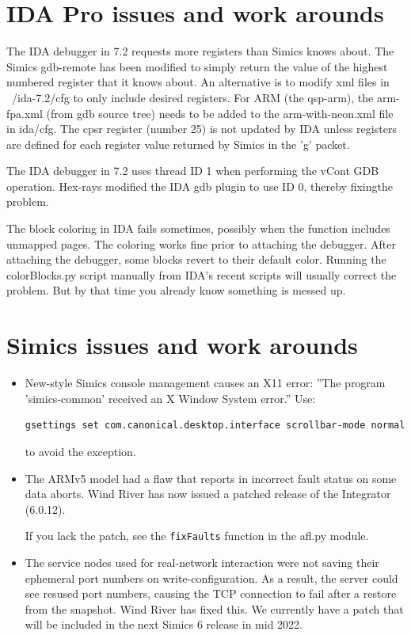 \documentclass[titlepage]{article}
\begin{document}
\begin{appendices}
\section{IDA Pro issues and work arounds}
The IDA debugger in 7.2 requests more registers than Simics knows about.  The Simics gdb-remote has been modified
to simply return the value of the highest numbered register that it knows about.  An alternative is to modify
xml files in ~/ida-7.2/cfg to only include desired registers.   For ARM (the qsp-arm), the arm-fpa.xml (from gdb source
tree) needs to be added to the arm-with-neon.xml file in ida/cfg.  The cpsr register (number 25) is not updated by IDA
unless registers are defined for each register value returned by Simics in the 'g' packet.

The IDA debugger in 7.2 uses thread ID 1 when performing the vCont GDB operation.  Hex-rays modified the IDA gdb plugin to
use ID 0, thereby fixingthe problem.

The block coloring in IDA fails sometimes, possibly when the function includes unmapped pages.  The coloring works fine prior
to attaching the debugger.  After attaching the debugger, some blocks revert to their default color.  Running the colorBlocks.py script
manually from IDA's recent scripts will usually correct the problem.  But by that time you already know something is messed up.

\section{Simics issues and work arounds}
\begin{itemize}
\item New-style Simics console management causes an X11 error: ''The program 'simics-common' received an X Window System error.''
Use:
\begin{verbatim}
gsettings set com.canonical.desktop.interface scrollbar-mode normal
\end{verbatim}
\noindent to avoid the exception.
\item The ARMv5 model had a flaw that reports in incorrect fault status on some data aborts.  Wind River has now issued a patched release
of the Integrator (6.0.12).

If you lack the patch, see the {\tt fixFaults} function in the afl.py module.

\item The service nodes used for real-network interaction were not saving their ephemeral port numbers on write-configuration.  As a result,
the server could see resused port numbers, causing the TCP connection to fail after a restore from the snapshot.  Wind River has fixed this.
We currently have a patch that will be included in the next Simics 6 release in mid 2022.
\end{itemize}


\end{appendices}
\end{document}
